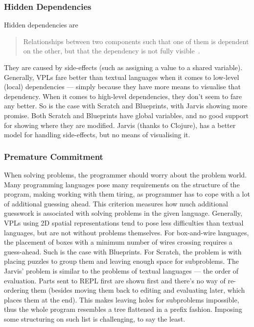 \documentclass[11pt]{scrartcl}
\begin{document}
\subsubsection{Hidden Dependencies}
Hidden dependencies are
\blockquote{Relationships between two
  components such that one of them is dependent on the other, but that the
  dependency is not fully visible~\cite{Green96UsabilityAnalysis}.}

They are caused by side-effects (such as assigning a value to a shared
variable).
Generally, VPLs fare better than textual languages when it comes to low-level
(local) dependencies --- simply because they have more means to visualise that
dependency.
When it comes to high-level dependencies, they don’t seem to fare any better.
So is the case with Scratch and Blueprints, with Jarvis showing more promise.
Both Scratch and Blueprints have global variables, and no good support for
showing where they are modified.
Jarvis (thanks to Clojure), has a better model for handling side-effects, but no
means of visualising it.

\subsubsection{Premature Commitment}
When solving problems, the programmer should worry about the problem world.
Many programming languages pose many requirements on the structure of the
program, making working with them tiring, as programmer has to cope with a lot
of additional guessing ahead.
This criterion measures how much additional guesswork is associated with solving
problems in the given language.
Generally, VPLs using 2D spatial representations tend to pose less difficulties
than textual languages, but are not without problems themselves.
For box-and-wire languages, the placement of boxes with a minimum number of
wires crossing requires a guess-ahead.
Such is the case with Blueprints.
For Scratch, the problem is with placing puzzles to group them and leaving
enough space for subproblems.
The Jarvis’ problem is similar to the problems of textual languages --- the order
of evaluation.
Parts sent to REPL first are shown first and there’s no way of re-ordering them
(besides moving them back to editing and evaluating later, which places them at
the end).
This makes leaving holes for subproblems impossible, thus the whole program
resembles a tree flattened in a prefix fashion.
Imposing some structuring on such list is challenging, to say the least.
\end{document}
